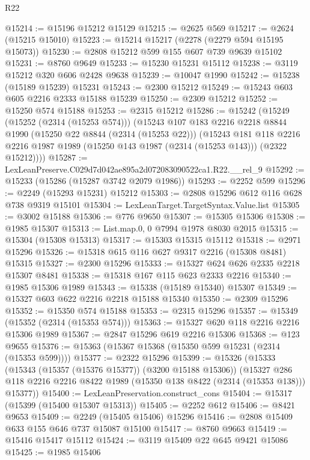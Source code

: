 \begin{lexlean}{R22}
\begin{coremodule}
@15214 := @15196 @15212 @15129
@15215 := @2625 @569
@15217 := @2624 (@15215 @15010)
@15223 := @15214 @15217 (@2278 (@2279 @594 @15195 @15073))
@15230 := @2808 @15212 @599 @155 @607 @739 @9639 @15102
@15231 := @8760 @9649
@15233 := @15230 @15231 @15112
@15238 := @3119 @15212 @320 @606 @2428 @9638
@15239 := @10047 @1990
@15242 := @15238 (@15189 @15239) @15231
@15243 := @2300 @15212
@15249 := @15243 @603 @605 @2216 @2333 @15188 @15239
@15250 := @2309 @15212
@15252 := @15250 @574 @15188
@15253 := @2315 @15212
@15286 := @15242
    (@15249
      (@15252 (@2314 (@15253 @574)))
      (@15243
        @107
        @183
        @2216
        @2218
        @8844
        @1990
        (@15250 @22 @8844 (@2314 (@15253 @22)))
        (@15243
          @181
          @118
          @2216
          @2216
          @1987
          @1989
          (@15250 @143 @1987 (@2314 (@15253 @143)))
          (@2322 @15212))))
@15287 := LexLeanPreserve.C029d7d042ae895a2d072083090522ca1.R22.__rel_9
@15292 := @15233 (@15286 (@15287 @3742 @2079 @1986))
@15293 := @2252 @599
@15296 := @2249 (@15293 @15231) @15212
@15303 := @2808 @15296 @612 @116 @628 @738 @9319 @15101
@15304 := LexLeanTarget.TargetSyntax.Value.list
@15305 := @3002 @15188
@15306 := @776 @9650
@15307 := @15305 @15306
@15308 := @1985 @15307
@15313 := List.map.{0, 0} @7994 @1978 @8030 @2015
@15315 := @15304 (@15308 @15313)
@15317 := @15303 @15315 @15112
@15318 := @2971 @15296
@15326 := @15318 @615 @116 @627 @9317 @2216 (@15308 @8481) @15315
@15327 := @2300 @15296
@15333 := @15327 @624 @626 @2335 @2218 @15307 @8481
@15338 := @15318 @167 @115 @623 @2333 @2216
@15340 := @1985 @15306 @1989
@15343 := @15338 (@15189 @15340) @15307
@15349 := @15327 @603 @622 @2216 @2218 @15188 @15340
@15350 := @2309 @15296
@15352 := @15350 @574 @15188
@15353 := @2315 @15296
@15357 := @15349 (@15352 (@2314 (@15353 @574)))
@15363 := @15327 @620 @118 @2216 @2216 @15306 @1989
@15367 := @2847 @15296 @619 @2216 @15306
@15368 := @123 @9655
@15376 := @15363 (@15367 @15368 (@15350 @599 @15231 (@2314 (@15353 @599))))
@15377 := @2322 @15296
@15399 := @15326
    (@15333
      (@15343 (@15357 (@15376 @15377)) (@3200 @15188 @15306))
      (@15327 @286 @118 @2216 @2216 @8422 @1989 (@15350 @138 @8422 (@2314 (@15353 @138))) @15377))
@15400 := LexLeanPreservation.construct_cons
@15404 := @15317 (@15399 (@15400 @15307 @15313))
@15405 := @2252 @612
@15406 := @8421 @9653
@15409 := @2249 (@15405 @15406) @15296
@15416 := @2808 @15409 @633 @155 @646 @737 @15087 @15100
@15417 := @8760 @9663
@15419 := @15416 @15417 @15112
@15424 := @3119 @15409 @22 @645 @9421 @15086
@15425 := @1985 @15406

\end{coremodule}
\end{lexlean}
